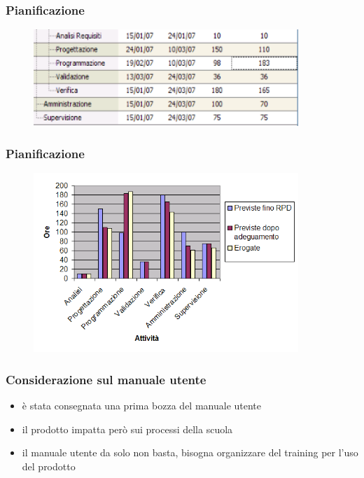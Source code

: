 \begin{frame}
\frametitle{Pianificazione}

\begin{figure}
  \includegraphics[width=10cm]{img/AdeguamentoOreGantt.png}
\end{figure}

\end{frame}

\begin{frame}
\frametitle{Pianificazione}

\begin{figure}
  \includegraphics[width=10cm]{img/Previste_Erogate.png}
\end{figure}

\end{frame}

\begin{frame}
\frametitle{Considerazione sul manuale utente}

\begin{itemize}
\item è stata consegnata una prima bozza del manuale utente
\item il prodotto impatta però sui processi della scuola
\item il manuale utente da solo non basta, bisogna organizzare del training per l'uso del prodotto
\end{itemize}

\end{frame}

